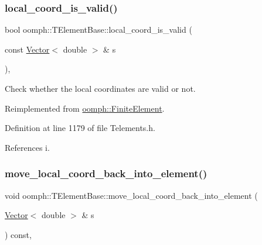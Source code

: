 \subsubsection{\texorpdfstring{local\+\_\+coord\+\_\+is\+\_\+valid()}{local\_coord\_is\_valid()}}
{\footnotesize\ttfamily bool oomph\+::\+T\+Element\+Base\+::local\+\_\+coord\+\_\+is\+\_\+valid (\begin{DoxyParamCaption}\item[{const \hyperlink{classoomph_1_1Vector}{Vector}$<$ double $>$ \&}]{s }\end{DoxyParamCaption})\hspace{0.3cm}{\ttfamily [inline]}, {\ttfamily [virtual]}}



Check whether the local coordinates are valid or not. 



Reimplemented from \hyperlink{classoomph_1_1FiniteElement_a9ae98c5b577d83303849ff57a9ae81f8}{oomph\+::\+Finite\+Element}.



Definition at line 1179 of file Telements.\+h.



References i.

\mbox{\label{classoomph_1_1TElementBase_a0cce6b402f810f136ee04847727ca02a}} 
\subsubsection{\texorpdfstring{move\+\_\+local\+\_\+coord\+\_\+back\+\_\+into\+\_\+element()}{move\_local\_coord\_back\_into\_element()}}
{\footnotesize\ttfamily void oomph\+::\+T\+Element\+Base\+::move\+\_\+local\+\_\+coord\+\_\+back\+\_\+into\+\_\+element (\begin{DoxyParamCaption}\item[{\hyperlink{classoomph_1_1Vector}{Vector}$<$ double $>$ \&}]{s }\end{DoxyParamCaption}) const\hspace{0.3cm}{\ttfamily [inline]}, {\ttfamily [virtual]}}



